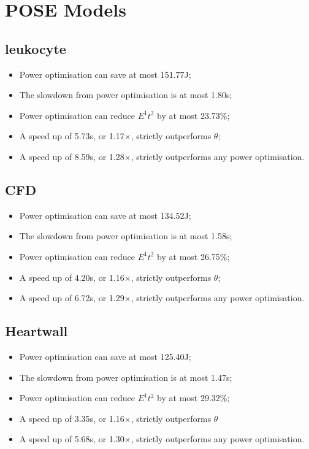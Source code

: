 \section{POSE Models}
\label{sec:appendix}
\scriptsize
\subsection{leukocyte}
\begin{itemize}
  \item Power optimisation can save at most 151.77J;
  \item The slowdown from power optimisation is at most 1.80s;
  \item Power optimisation can reduce $E^1t^2$ by at most 23.73\%;
  \item A speed up of 5.73s, or 1.17$\times$, strictly outperforms $\theta$;
  \item A speed up of 8.59s, or 1.28$\times$, strictly outperforms any power optimisation.
\end{itemize}

\subsection{CFD}
\begin{itemize}
  \item Power optimisation can save at most 134.52J;
  \item The slowdown from power optimisation is at most 1.58s;
  \item Power optimisation can reduce $E^1t^2$ by at most 26.75\%;
  \item A speed up of 4.20s, or 1.16$\times$, strictly outperforms $\theta$;
  \item A speed up of 6.72s, or 1.29$\times$, strictly outperforms any power optimisation.
\end{itemize}

\subsection{Heartwall}
\begin{itemize}
  \item Power optimisation can save at most 125.40J;
  \item The slowdown from power optimisation is at most 1.47s;
  \item Power optimisation can reduce $E^1t^2$ by at most 29.32\%;
  \item A speed up of 3.35s, or 1.16$\times$, strictly outperforms $\theta$
  \item A speed up of 5.68s, or 1.30$\times$, strictly outperforms any power optimisation.
\end{itemize}

